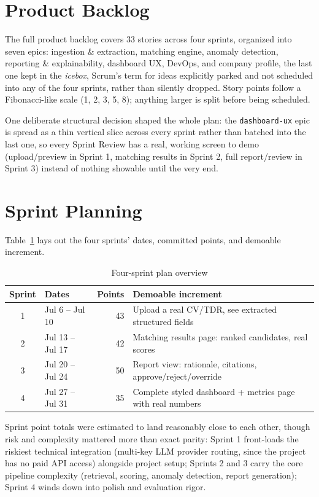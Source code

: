 \section{Product Backlog}
\label{sec:product-backlog}

The full product backlog covers 33 stories across four sprints, organized
into seven epics: ingestion \& extraction, matching engine, anomaly
detection, reporting \& explainability, dashboard UX, DevOps, and company
profile, the last one kept in the \emph{icebox}, Scrum's term for ideas
explicitly parked and not scheduled into any of the four sprints, rather
than silently dropped. Story points follow a Fibonacci-like scale
(1, 2, 3, 5, 8); anything larger is split before being scheduled.

One deliberate structural decision shaped the whole plan: the
\texttt{dashboard-ux} epic is spread as a thin vertical slice across
every sprint rather than batched into the last one, so every Sprint
Review has a real, working screen to demo (upload/preview in Sprint 1,
matching results in Sprint 2, full report/review in Sprint 3) instead of
nothing showable until the very end.

\section{Sprint Planning}

Table~\ref{tab:sprint-plan} lays out the four sprints' dates, committed points, and demoable increment.

\begin{table}[H]
  \centering
  \caption{Four-sprint plan overview}
  \label{tab:sprint-plan}
  \begin{tabular}{@{}clrl@{}}
    \toprule
    Sprint & Dates & Points & Demoable increment \\
    \midrule
    1 & Jul 6 -- Jul 10  & 43 & Upload a real CV/TDR, see extracted structured fields \\
    2 & Jul 13 -- Jul 17 & 42 & Matching results page: ranked candidates, real scores \\
    3 & Jul 20 -- Jul 24 & 50 & Report view: rationale, citations, approve/reject/override \\
    4 & Jul 27 -- Jul 31 & 35 & Complete styled dashboard + metrics page with real numbers \\
    \bottomrule
  \end{tabular}
\end{table}

Sprint point totals were estimated to land reasonably close to each
other, though risk and complexity mattered more than exact parity:
Sprint 1 front-loads the riskiest technical
integration (multi-key LLM provider routing, since the project has no
paid API access) alongside project setup; Sprints 2 and 3 carry the core
pipeline complexity (retrieval, scoring, anomaly detection, report
generation); Sprint 4 winds down into polish and evaluation rigor.

